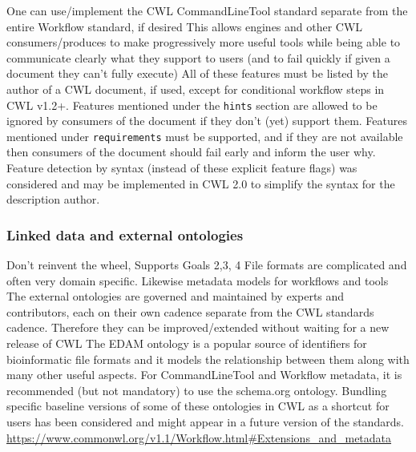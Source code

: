 One can use/implement the CWL CommandLineTool standard separate from the entire Workflow standard, if desired
This allows engines and other CWL consumers/produces to make progressively more useful tools while being able to communicate clearly what they support to users (and to fail quickly if given a document they can’t fully execute)
All of these features must be listed by the author of a CWL document, if used, except for conditional workflow steps in CWL v1.2+. Features mentioned under the \verb|hints| section are allowed to be ignored by consumers of the document if they don’t (yet) support them. Features mentioned under \verb|requirements| must be supported, and if they are not available then consumers of the document should fail early and inform the user why.
Feature detection by syntax (instead of these explicit feature flags) was considered and may be implemented in CWL 2.0 to simplify the syntax for the description author.

\subsubsection{Linked data and external ontologies}

Don’t reinvent the wheel, Supports Goals 2,3, 4
File formats are complicated and often very domain specific. Likewise metadata models for workflows and tools
The external ontologies are governed and maintained by experts and contributors, each on their own cadence separate from the CWL standards cadence. Therefore they can be improved/extended without waiting for a new release of CWL
The EDAM ontology is a popular source of identifiers for bioinformatic file formats and it models the relationship between them along with many other useful aspects. For CommandLineTool and Workflow metadata, it is recommended (but not mandatory) to use the schema.org ontology.
Bundling specific baseline versions of some of these ontologies in CWL as a shortcut for users has been considered and might appear in a future version of the standards.
\url{https://www.commonwl.org/v1.1/Workflow.html#Extensions_and_metadata}

